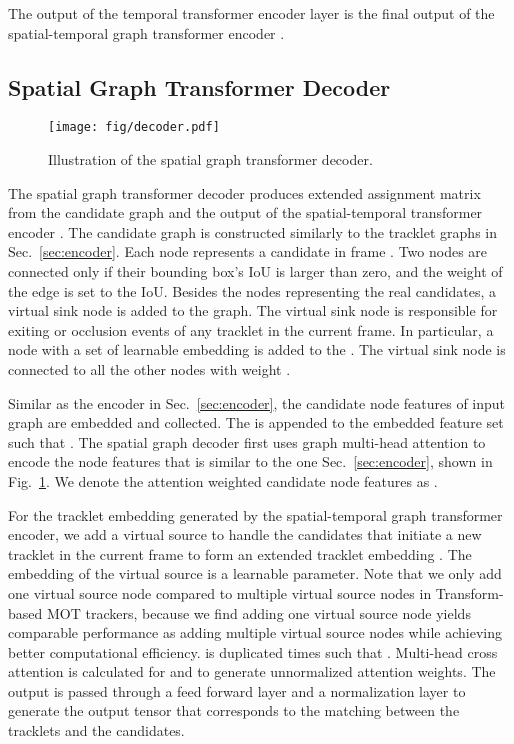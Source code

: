 \documentclass[10pt,twocolumn,letterpaper]{article}
\newcommand{\tb}{}
\begin{document}
The output of the temporal transformer encoder layer is the final output of the spatial-temporal graph transformer encoder .  

\subsection{Spatial Graph Transformer Decoder}
\label{sec:decoder}

\begin{figure}
	\centering
	\texttt{[image: fig/decoder.pdf]}
	\caption{Illustration of the spatial graph transformer decoder.}
	\label{fig:decoder}
\end{figure}

The spatial graph transformer decoder produces extended assignment matrix  from the candidate graph  and the output of the spatial-temporal transformer encoder .  
The candidate graph is constructed similarly to the tracklet graphs in Sec.~\ref{sec:encoder}. Each node  represents a candidate in frame . \tb{Two nodes} are connected only if their bounding box's IoU is larger than zero, and the weight of the edge is set to the IoU. 
Besides the nodes representing the real candidates, a virtual sink node is added to the graph. The virtual sink node is responsible for exiting or occlusion events of any tracklet in the current frame. In particular, a node with a set of learnable embedding  is added to the . The virtual sink node is connected to all the other nodes with weight .

Similar as the encoder in Sec.~\ref{sec:encoder}, the candidate node features of input graph are embedded and collected. The  is appended to the embedded feature set such that . 
The spatial graph decoder first uses graph multi-head attention to encode the node features that is similar to the one Sec.~\ref{sec:encoder}, shown in Fig.~\ref{fig:decoder}. 
We denote the attention weighted candidate node features as .


For the tracklet embedding  generated by the spatial-temporal graph transformer encoder, we add a virtual source to handle the candidates that initiate a new tracklet in the current frame  to form an extended tracklet embedding . The embedding of the virtual source is a learnable parameter.
Note that we only add one virtual source node compared to multiple virtual source nodes in Transform-based MOT trackers, because we find adding one virtual source node yields comparable performance as adding multiple virtual source nodes while achieving better computational efficiency.  is duplicated  times such that . Multi-head cross attention is calculated for  and  to generate 
unnormalized attention weights. The output is passed through a feed forward layer and a normalization layer to generate the output tensor 
 that corresponds to the matching between the tracklets and the candidates.
\end{document}
